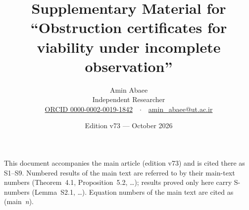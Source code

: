 \documentclass[11pt,a4paper]{article}
\title{\vspace{-1.2em}Supplementary Material for\\``Obstruction certificates for viability under incomplete observation''}
\author{Amin Abaee\\[0.3em]{\normalsize Independent Researcher}\\
{\normalsize \href{https://orcid.org/0000-0002-0019-1842}{ORCID 0000-0002-0019-1842}\ \ $\cdot$\ \ \href{mailto:amin_abaee@ut.ac.ir}{amin\_abaee@ut.ac.ir}}}
\date{Edition v73 --- October 2026}
\theoremstyle{plain}
\theoremstyle{definition}
\theoremstyle{remark}
\begin{document}
\maketitle
\vspace{-1em}
\noindent This document accompanies the main article (edition v73) and is cited there as S1--S9. Numbered results of the main text are referred to by their main-text numbers (Theorem~4.1, Proposition~5.2, \dots); results proved only here carry S-numbers (Lemma~S2.1, \dots). Equation numbers of the main text are cited as (main~\textit{n}).

\tableofcontents
\bigskip
\end{document}
